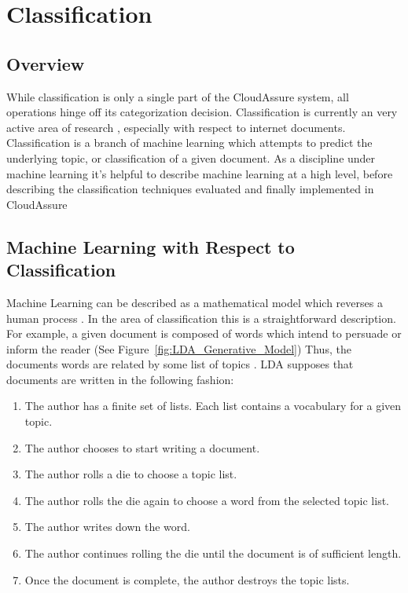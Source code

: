 \section{Classification}
\subsection{Overview}
While classification is only a single part of the CloudAssure system, all
operations hinge off its categorization decision. Classification is currently an
very active area of research \autocite{Zhang2000}, especially with respect to
internet documents. Classification is a branch of machine learning which
attempts to predict the underlying topic, or classification of a given document.
As a discipline under machine learning it's helpful to describe machine learning
at a high level, before describing the classification techniques evaluated and
finally implemented in CloudAssure

\subsection{Machine Learning with Respect to Classification}
Machine Learning can be described as a mathematical model which reverses a human
process \autocite{Bishop2009}. In the area of classification this is
a straightforward description. For example, a given document is composed of words which
intend to persuade or inform the reader (See
Figure~\ref{fig:LDA_Generative_Model}) Thus, the documents words are related
by some list of topics \autocite{Blei2009}. \gls{LDA} supposes that documents are
written in the following fashion:
\begin{enumerate}
    \item The author has a finite set of lists. Each list contains a vocabulary
        for a given topic.
    \item The author chooses to start writing a document.
    \item The author rolls a die to choose a topic list.
    \item The author rolls the die again to choose a word from the selected
        topic list.
    \item The author writes down the word.
    \item The author continues rolling the die until the document is of sufficient
        length.
    \item Once the document is complete, the author destroys the topic lists.
\end{enumerate}

